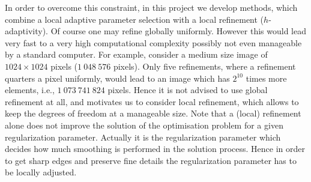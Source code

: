 \documentclass[enabledeprecatedfontcommands,cleardoublepage=empty,headsepline,twoside,11pt,DIV=15,BCOR=12mm,final]{scrartcl}
\begin{document}
In order to overcome this constraint, in this project we develop methods, which combine a local adaptive parameter selection with a local refinement ($h$-adaptivity). Of course one may refine globally uniformly. However this would lead very fast to a very high computational complexity possibly not even manageable by a standard computer. For example, consider a medium size image of $1024 \times 1024$ pixels ($1\ 048\ 576$ pixels). Only five refinements, where a refinement quarters a pixel uniformly, would lead to an image which has $2^{10}$ times more elements, i.e., $1\ 073\ 741\ 824$ pixels. Hence it is not advised to use global refinement at all, and motivates us to consider local refinement, which allows to keep the degrees of freedom at a manageable size. Note that a (local) refinement alone does not improve the solution of the optimisation problem for a given regularization parameter. Actually it is the regularization parameter which decides how much smoothing is performed in the solution process. Hence in order to get sharp edges and preserve fine details the regularization parameter has to be locally adjusted. 
\end{document}
